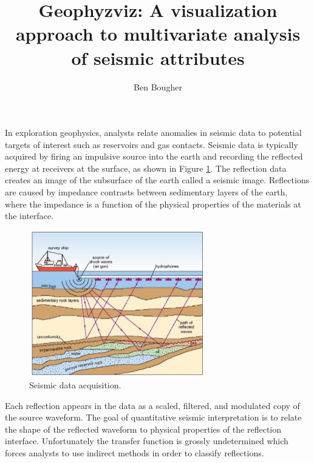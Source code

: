 \documentclass[journal]{vgtc}                %
\title{Geophyzviz: A visualization approach to multivariate analysis of seismic attributes}
\author{Ben Bougher}
\begin{document}


\maketitle


In exploration geophysics, analysts relate anomalies in seismic data to
potential targets of interest such as reservoirs and gas contacts.
Seismic data is typically acquired by firing an impulsive source into the earth and
recording the reflected energy at receivers at the surface, as shown in Figure \ref{seismic_acq}. The reflection data creates an image
of the subsurface of the earth called a seismic image. Reflections are caused by
impedance contrasts between sedimentary layers of the earth, where the impedance is a function
of the physical properties of the materials at the interface. 
\begin{figure}[htb]
\centering
\includegraphics[width=3in]{seismic}
\caption{Seismic data acquisition.}
\label{seismic_acq}
\end{figure}

Each reflection appears in the data as
a scaled, filtered, and modulated copy of the source waveform. The goal of quantitative
seismic interpretation is to relate the shape of the reflected waveform to physical
properties of the reflection interface. Unfortunately the transfer function is grossly
undetermined which forces analysts to use indirect methods in order to classify reflections.
\end{document}
